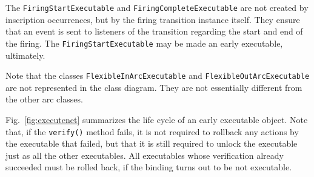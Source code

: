 The \texttt{FiringStartExecutable} and \texttt{FiringCompleteExecutable}
are not created by inscription occurrences, but by the firing
transition instance itself. They ensure that an event is sent
to listeners of the transition regarding the start and
end of the firing. The \texttt{FiringStartExecutable} may be made
an early executable, ultimately.

Note that the classes \texttt{FlexibleInArcExecutable} and
\texttt{FlexibleOutArcExecutable} are not represented in
the class diagram. They are not essentially different
from the other arc classes.


Fig.~\ref{fig:executenet} summarizes the life cycle of an
early executable object. Note that, if the \texttt{verify()} method
fails, it is not required to rollback any actions by the
executable that failed, but that it is still required to
unlock the executable just as all the other executables.
All executables whose verification already succeeded must
be rolled back, if the binding turns out to be not executable.

